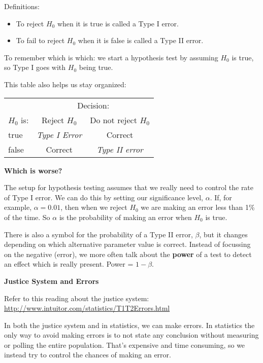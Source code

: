 Definitions:\vspace{-.6cm}
\begin{itemize}
  \item To reject $H_0$ when it is true is called a Type I error.
  \item To fail to reject $H_0$ when it is false is called a Type II error.
\vspace{-.6cm}
\end{itemize}
To remember which is which: we start a hypothesis test by assuming
$H_0$ is true, so Type I goes with $H_0$ being true. 

This table also helps us stay organized: \hfill
\begin{tabular}{|l|c|c|}\hline
   & \multicolumn{2}{|c|}{Decision:} \\
$H_0$ is:  & Reject $H_0$ & Do not reject $H_0$\\\hline
true & {\em Type I Error} & Correct  \\ \hline
false& Correct & {\em Type II error}   \\ \hline\hline
\end{tabular}



{\bf Which is worse?}

The setup for hypothesis testing assumes that we really need to
control the rate of Type I error.  We can do this by setting our
 significance level, $\alpha$.  If, for example, $\alpha = 0.01$, then
 when we reject $H_0$ we are making an error less than 1\% of the time.
So $\alpha$ is the probability of making an error when $H_0$ is true.

There is also a symbol for the probability of a Type II error,
$\beta$, but it changes depending on which alternative parameter
value is correct. Instead of focussing on the negative (error), we
more often talk about the {\bf power} of a test to detect an effect
which is really present.  Power = $1-\beta$.



\begin{center}
  {\bf Justice System and Errors }
\end{center}

Refer to this reading about the justice system:\\
\url{http://www.intuitor.com/statistics/T1T2Errors.html}  

In both the justice system and in statistics, we can make errors. In
statistics the only way to avoid making errors is to not state any
conclusion without measuring or polling the entire population.  That's
expensive and time consuming, so we instead try to control the chances
of making an error.  
 

